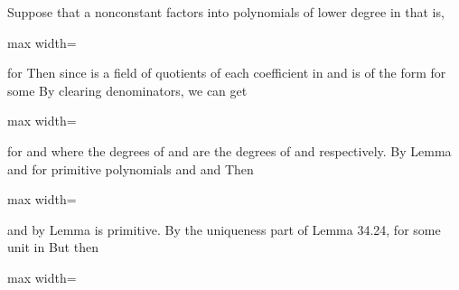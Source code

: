 \documentclass[11pt,oneside]{article}
\begin{document}
\begin{BookBody}

 Suppose that a nonconstant  factors into polynomials of lower degree in  that is,

\begin{center}\begin{adjustbox}{max width=\linewidth}\end{adjustbox}\end{center}

\noindent for  Then since  is a field of quotients of  each coefficient in  and  is of the form  for some  By clearing denominators, we can get

\begin{center}\begin{adjustbox}{max width=\linewidth}\end{adjustbox}\end{center}

\noindent for  and  where the degrees of  and  are the degrees of  and  respectively. By Lemma  and  for primitive polynomials  and  and  Then

\begin{center}\begin{adjustbox}{max width=\linewidth}\end{adjustbox}\end{center}

\noindent and by Lemma  is primitive. By the uniqueness part of Lemma 34.24,  for some unit  in  But then

\begin{center}\begin{adjustbox}{max width=\linewidth}\end{adjustbox}\end{center}


\end{BookBody}
\end{document}
